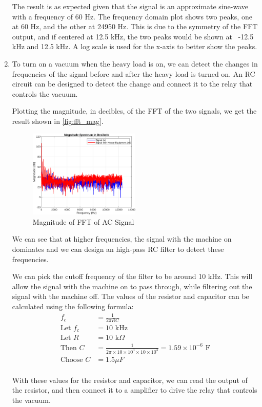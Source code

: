 \documentclass{article}
\begin{document}
\begin{enumerate}[label=\alph*.]
    The result is as expected given that the signal is an approximate sine-wave with a frequency of 60 Hz. The frequency domain plot shows two peaks, one at 60 Hz, and the other at 24950 Hz. This is due to the symmetry of the FFT output, and if centered at 12.5 kHz, the two peaks would be shown at ~-12.5 kHz and 12.5 kHz. A log scale is used for the x-axis to better show the peaks. 

    \item To turn on a vacuum when the heavy load is on, we can detect the changes in frequencies of the signal before and after the heavy load is turned on. An RC circuit can be designed to detect the change and connect it to the relay that controls the vacuum. 

    Plotting the magnitude, in decibles, of the FFT of the two signals, we get the result shown in \autoref{fig:fft_mag}.

    \begin{figure}[ht!]
        \centering
        \includegraphics[width=0.5\textwidth]{fft_compare.png}
        \caption{Magnitude of FFT of AC Signal}
        \label{fig:fft_mag}
    \end{figure}

    We can see that at higher frequencies, the signal with the machine on dominates and we can design an high-pass RC filter to detect these frequencies.

    We can pick the cutoff frequency of the filter to be around 10 kHz. This will allow the signal with the machine on to pass through, while filtering out the signal with the machine off. The values of the resistor and capacitor can be calculated using the following formula:
    \begin{align*}
        f_c &= \frac{1}{2\pi RC} \\
        \text{Let } f_c &= 10 \text{ kHz} \\
        \text{Let } R &= 10 \text{ k}\Omega \\
        \text{Then } C &= \frac{1}{2\pi \times 10 \times 10^3 \times 10 \times 10^3} = 1.59 \times 10^{-6} \text{ F}\\
        \text{Choose } C &= 1.5 \mu F \\
    \end{align*}

    With these values for the resistor and capacitor, we can read the output of the resistor, and then connect it to a amplifier to drive the relay that controls the vacuum.

\end{enumerate}
\end{document}
